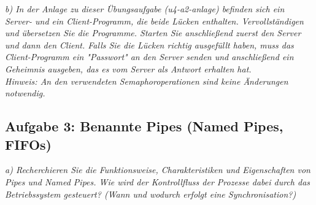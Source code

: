 \documentclass[a4paper]{article}
\begin{document}
\textit{b) In der Anlage zu dieser Übungsaufgabe (u4-a2-anlage) befinden sich ein Server- und ein Client-Programm, die beide Lücken enthalten. Vervollständigen und übersetzen Sie die Programme. Starten Sie anschließend zuerst den Server und dann den Client. Falls Sie die Lücken richtig ausgefüllt haben, muss das Client-Programm ein "Passwort" an den Server senden und anschließend ein Geheimnis ausgeben, das es vom Server als Antwort erhalten hat.\\
    Hinweis: An den verwendeten Semaphoroperationen sind keine Änderungen notwendig.}
\vspace{10mm}

\subsection{Aufgabe 3: Benannte Pipes (Named Pipes, FIFOs)}
\textit{a) Recherchieren Sie die Funktionsweise, Charakteristiken und Eigenschaften von Pipes und Named Pipes. Wie wird der Kontrollfluss der Prozesse dabei durch das Betriebssystem gesteuert? (Wann und wodurch erfolgt eine Synchronisation?)}
\vspace{10mm}
\end{document}
